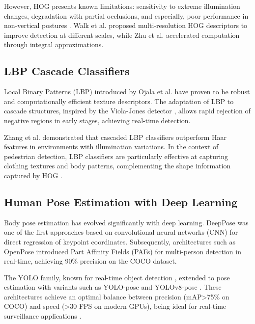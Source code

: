 \documentclass[conference]{IEEEtran}
\begin{document}
However, HOG presents known limitations: sensitivity to extreme illumination changes, degradation with partial occlusions, and especially, poor performance in non-vertical postures \cite{benenson2014ten}. Walk et al. \cite{walk2010multi} proposed multi-resolution HOG descriptors to improve detection at different scales, while Zhu et al. \cite{zhu2006fast} accelerated computation through integral approximations.

\subsection{LBP Cascade Classifiers}

Local Binary Patterns (LBP) introduced by Ojala et al. \cite{ojala2002multiresolution} have proven to be robust and computationally efficient texture descriptors. The adaptation of LBP to cascade structures, inspired by the Viola-Jones detector \cite{viola2004robust}, allows rapid rejection of negative regions in early stages, achieving real-time detection.

Zhang et al. \cite{zhang2007local} demonstrated that cascaded LBP classifiers outperform Haar features in environments with illumination variations. In the context of pedestrian detection, LBP classifiers are particularly effective at capturing clothing textures and body patterns, complementing the shape information captured by HOG \cite{walk2010multi}.

\subsection{Human Pose Estimation with Deep Learning}

Body pose estimation has evolved significantly with deep learning. DeepPose \cite{toshev2014deeppose} was one of the first approaches based on convolutional neural networks (CNN) for direct regression of keypoint coordinates. Subsequently, architectures such as OpenPose \cite{cao2017realtime} introduced Part Affinity Fields (PAFs) for multi-person detection in real-time, achieving 90\% precision on the COCO dataset.

The YOLO family, known for real-time object detection \cite{redmon2016you}, extended to pose estimation with variants such as YOLO-pose and YOLOv8-pose \cite{ultralytics2023yolov8}. These architectures achieve an optimal balance between precision (mAP>75\% on COCO) and speed (>30 FPS on modern GPUs), being ideal for real-time surveillance applications \cite{maji2022yolo}.
\end{document}

